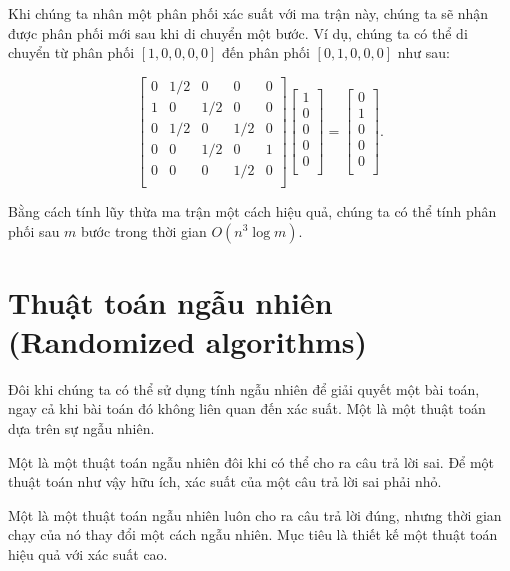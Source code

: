 Khi chúng ta nhân một phân phối xác suất với ma trận này,
chúng ta sẽ nhận được phân phối mới sau khi di chuyển một bước.
Ví dụ, chúng ta có thể di chuyển từ phân phối
$[1,0,0,0,0]$ đến phân phối
$[0,1,0,0,0]$ như sau:

\[ 
 \begin{bmatrix}
  0 & 1/2 & 0 & 0 & 0 \\
  1 & 0 & 1/2 & 0 & 0 \\
  0 & 1/2 & 0 & 1/2 & 0 \\
  0 & 0 & 1/2 & 0 & 1 \\
  0 & 0 & 0 & 1/2 & 0 \\
 \end{bmatrix}
 \begin{bmatrix}
  1 \\
  0 \\
  0 \\
  0 \\
  0 \\
 \end{bmatrix}
=
 \begin{bmatrix}
  0 \\
  1 \\
  0 \\
  0 \\
  0 \\
 \end{bmatrix}.
\]

Bằng cách tính lũy thừa ma trận một cách hiệu quả,
chúng ta có thể tính phân phối sau $m$ bước
trong thời gian $O(n^3 \log m)$.

\section{Thuật toán ngẫu nhiên (Randomized algorithms)}


Đôi khi chúng ta có thể sử dụng tính ngẫu nhiên để giải quyết một bài toán,
ngay cả khi bài toán đó không liên quan đến xác suất.
Một  là một thuật toán
dựa trên sự ngẫu nhiên.


Một  là một thuật toán ngẫu nhiên
đôi khi có thể cho ra câu trả lời sai.
Để một thuật toán như vậy hữu ích,
xác suất của một câu trả lời sai phải nhỏ.


Một  là một thuật toán ngẫu nhiên
luôn cho ra câu trả lời đúng,
nhưng thời gian chạy của nó thay đổi một cách ngẫu nhiên.
Mục tiêu là thiết kế một thuật toán
hiệu quả với xác suất cao.

